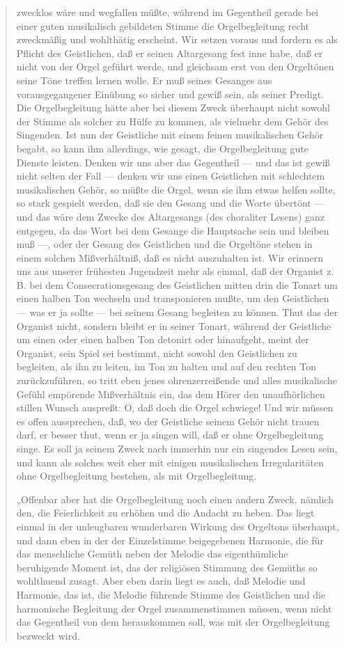 \begin{quote}
zwecklos wäre und wegfallen müßte, während im Gegentheil gerade bei einer guten musikalisch gebildeten Stimme die Orgelbegleitung recht zweckmäßig und wohlthätig erscheint. Wir setzen voraus und fordern es als Pflicht des Geistlichen, daß er seinen Altargesang fest inne habe, daß er nicht von der Orgel geführt werde, und gleichsam erst von den Orgeltönen seine Töne treffen lernen wolle. Er muß seines Gesanges aus vorausgegangener Einübung so sicher und gewiß sein, als seiner Predigt. Die Orgelbegleitung hätte aber bei diesem Zweck überhaupt nicht sowohl der Stimme als solcher zu Hülfe zu kommen, als vielmehr dem Gehör des Singenden. Ist nun der Geistliche mit einem feinen musikalischen Gehör begabt, so kann ihm allerdings, wie gesagt, die Orgelbegleitung gute Dienste leisten. Denken wir uns aber das Gegentheil — und das ist gewiß nicht selten der Fall — denken wir uns einen Geistlichen mit schlechtem musikalischen Gehör, so müßte die Orgel, wenn sie ihm etwas helfen sollte, so stark gespielt werden, daß sie den Gesang und die Worte übertönt — und das wäre dem Zwecke des Altargesangs (des choraliter Lesens) ganz entgegen, da das Wort bei dem Gesange die Hauptsache sein und bleiben muß —, oder der Gesang des Geistlichen und die Orgeltöne stehen in einem solchen Mißverhältniß, daß es nicht auszuhalten ist. Wir erinnern uns aus unserer frühesten Jugendzeit mehr als einmal, daß der Organist z. B. bei dem Consecrationsgesang des Geistlichen mitten drin die Tonart um einen halben Ton wechseln und transponieren mußte, um den Geistlichen — was er ja sollte — bei seinem Gesang begleiten zu können. Thut das der Organist nicht, sondern bleibt er in seiner Tonart, während der Geistliche um einen oder einen halben Ton detonirt oder hinaufgeht, meint der Organist, sein Spiel sei bestimmt, nicht sowohl den Geistlichen zu begleiten, als ihn zu leiten, im Ton zu halten und auf den rechten Ton zurückzuführen, so tritt eben jenes ohrenzerreißende und alles musikalische Gefühl empörende Mißverhältnis ein, das dem Hörer den unaufhörlichen stillen Wunsch auspreßt: O, daß doch die Orgel schwiege! Und wir müssen es offen aussprechen, daß, wo der Geistliche seinem Gehör nicht trauen darf, er besser thut, wenn er ja singen will, daß er ohne Orgelbegleitung singe. Es soll ja seinem Zweck nach immerhin nur ein singendes Lesen sein, und kann als solches weit eher mit einigen musikalischen Irregularitäten ohne Orgelbegleitung bestehen, als mit Orgelbegleitung.

„Offenbar aber hat die Orgelbegleitung noch einen andern Zweck, nämlich den, die Feierlichkeit zu erhöhen und die Andacht zu heben. Das liegt einmal in der unleugbaren wunderbaren Wirkung des Orgeltons überhaupt,
und dann eben in der der Einzelstimme beigegebenen Harmonie, die für das menschliche Gemüth neben der Melodie das eigenthümliche beruhigende Moment ist, das der religiösen Stimmung des Gemüths so wohlthuend zusagt. Aber eben darin liegt es auch, daß Melodie und Harmonie, das ist, die Melodie führende Stimme des Geistlichen und die harmonische Begleitung der Orgel zusammenstimmen müssen, wenn nicht das Gegentheil von dem herauskommen soll, was mit der Orgelbegleitung bezweckt wird.


\end{quote}
